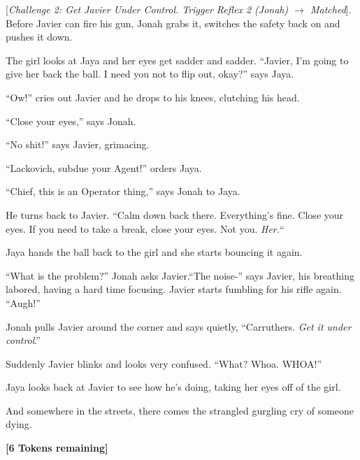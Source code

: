 {[}\textit{Challenge 2: Get Javier Under Control.  Trigger Reflex 2 (Jonah) $\rightarrow$ Matched}{]}. Before Javier can fire his gun, Jonah grabs it, switches the safety back on and pushes it down. 

The girl looks at Jaya and her eyes get sadder and sadder.  ``Javier, I'm going to give her back the ball.  I need you not to flip out, okay?'' says Jaya.

``Ow!'' cries out Javier and he drops to his knees, clutching his head.

``Close your eyes,'' says Jonah.

``No shit!'' says Javier, grimacing.

``Lackovich, subdue your Agent!'' orders Jaya.

``Chief, this is an Operator thing,'' says Jonah to Jaya.

He turns back to Javier.  ``Calm down back there.  Everything's fine.  Close your eyes.  If you need to take a break, close your eyes.  Not you.  \textit{Her.}``  

Jaya hands the ball back to the girl and she starts bouncing it again.

``What is the problem?'' Jonah asks Javier.``The noise-'' says Javier, his breathing labored, having a hard time focusing.  Javier starts fumbling for his rifle again. ``Augh!''

Jonah pulls Javier around the corner and says quietly, ``Carruthers.  \textit{Get it under control}.''

Suddenly Javier blinks and looks very confused.  ``What?  Whoa.  WHOA!''

Jaya looks back at Javier to see how he's doing, taking her eyes off of the girl.



And somewhere in the streets, there comes the strangled gurgling cry of someone dying.





\textbf{{[}6 Tokens remaining{]}}









